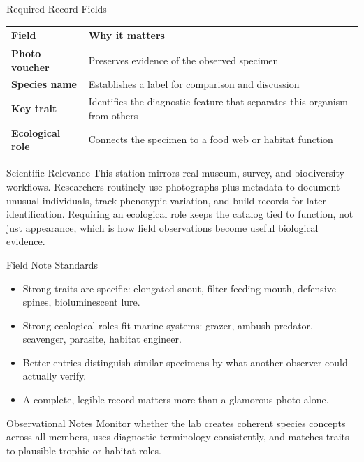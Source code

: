 \documentclass[10pt]{article}
\begin{document}
\begin{minipage}[t]{0.485\textwidth}
\vspace{0pt}
\begin{labbox}{Required Record Fields}
\begin{tabularx}{\linewidth}{@{}>{\bfseries}l Y@{}}
\toprule
Field & Why it matters \\
\midrule
Photo voucher & Preserves evidence of the observed specimen \\
Species name & Establishes a label for comparison and discussion \\
Key trait & Identifies the diagnostic feature that separates this organism from others \\
Ecological role & Connects the specimen to a food web or habitat function \\
\bottomrule
\end{tabularx}
\end{labbox}

\begin{labbox}{Scientific Relevance}
This station mirrors real museum, survey, and biodiversity workflows. Researchers routinely use photographs plus metadata to document unusual individuals, track phenotypic variation, and build records for later identification. Requiring an ecological role keeps the catalog tied to function, not just appearance, which is how field observations become useful biological evidence.
\end{labbox}

\begin{labbox}{Field Note Standards}
\begin{itemize}
\item Strong traits are specific: elongated snout, filter-feeding mouth, defensive spines, bioluminescent lure.
\item Strong ecological roles fit marine systems: grazer, ambush predator, scavenger, parasite, habitat engineer.
\item Better entries distinguish similar specimens by what another observer could actually verify.
\item A complete, legible record matters more than a glamorous photo alone.
\end{itemize}
\end{labbox}

\begin{labbox}{Observational Notes}
Monitor whether the lab creates coherent species concepts across all members, uses diagnostic terminology consistently, and matches traits to plausible trophic or habitat roles.
\end{labbox}
\end{minipage}
\end{document}
